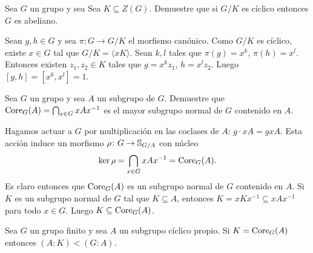 \begin{exercise}
	\label{exercise:G/Z(G)}
	Sea $G$ un grupo y sea Sea $K\subseteq Z(G)$. Demuestre que si $G/K$ es
	cíclico entonces $G$ es abeliano.
\end{exercise}

\begin{svgraybox}
	Sean $g,h\in G$ y sea $\pi\colon G\to G/K$ el morfismo canónico. Como $G/K$
	es cíclico, existe $x\in G$ tal que $G/K=\langle xK\rangle$. Sean $k,l$ tales que 
	$\pi(g)=x^k$, $\pi(h)=x^l$. Entonces existen $z_1,z_2\in K$ tales que 
	$g=x^kz_1$, $h=x^lz_2$. Luego $[g,h]=[x^k,x^l]=1$. 
\end{svgraybox}

\begin{exercise}
	Sea $G$ un grupo y sea $A$ un subgrupo de $G$.  Demuestre que
	$\operatorname{Core}_{G}(A)=\bigcap_{x\in G}xAx^{-1}$ es el mayor subgrupo normal de $G$
	contenido en $A$.
\end{exercise}

\begin{svgraybox}
	Hagamos actuar a $G$ por multiplicación en las coclases de $A$: $g\cdot
	xA=gxA$. Esta acción induce un morfismo $\rho\colon G\to \mathbb{S}_{G/A}$ con
	núcleo
	\[
		\ker\rho=\bigcap_{x\in G}xAx^{-1}=\operatorname{Core}_G(A).
	\]
	Es claro entonces que $\operatorname{Core}_G(A)$ es un subgrupo normal de $G$ contenido
	en $A$. Si $K$ es un subgrupo normal de $G$ tal que $K\subseteq A$,
	entonces $K=xKx^{-1}\subseteq xAx^{-1}$ para todo $x\in G$. Luego
	$K\subseteq\operatorname{Core}_G(A)$.
\end{svgraybox}

\begin{theorem}[Lucchini]
	\label{theorem:Lucchini}
	Sea $G$ un grupo finito y sea $A$ un subgrupo cíclico propio. Si
	$K=\operatorname{Core}_G(A)$ entonces $(A:K)<(G:A)$.
\end{theorem}

